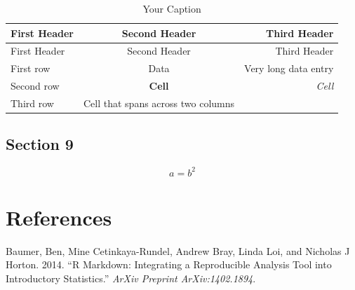 \documentclass[12pt,]{article}
\begin{document}
\begin{longtable}[]{@{}lcr@{}}
\caption{Your Caption}\tabularnewline
\toprule
First Header & Second Header & Third Header\tabularnewline
\midrule
\endfirsthead
\toprule
First Header & Second Header & Third Header\tabularnewline
\midrule
\endhead
First row & Data & Very long data entry\tabularnewline
Second row & \textbf{Cell} & \emph{Cell}\tabularnewline
Third row & Cell that spans across two columns &\tabularnewline
\bottomrule
\end{longtable}

\subsection{Section 9}\label{section-9}

\begin{equation}
a=b^2
\end{equation}

\section*{References}\label{references}

\hypertarget{refs}{}
\hypertarget{ref-baumer2014r}{}
Baumer, Ben, Mine Cetinkaya-Rundel, Andrew Bray, Linda Loi, and Nicholas
J Horton. 2014. ``R Markdown: Integrating a Reproducible Analysis Tool
into Introductory Statistics.'' \emph{ArXiv Preprint ArXiv:1402.1894}.
\end{document}
